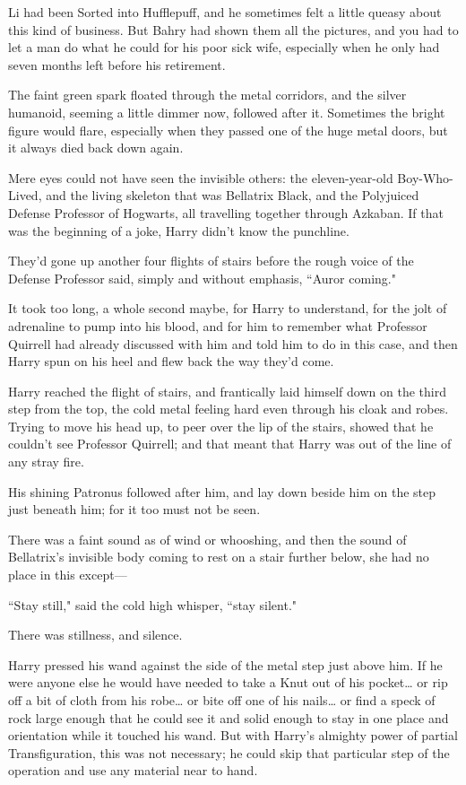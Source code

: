 Li had been Sorted into Hufflepuff, and he sometimes felt a little queasy about this kind of business. But Bahry had shown them all the pictures, and you had to let a man do what he could for his poor sick wife, especially when he only had seven months left before his retirement.

\later

The faint green spark floated through the metal corridors, and the silver humanoid, seeming a little dimmer now, followed after it. Sometimes the bright figure would flare, especially when they passed one of the huge metal doors, but it always died back down again.

Mere eyes could not have seen the invisible others: the eleven-year-old Boy-Who-Lived, and the living skeleton that was Bellatrix Black, and the Polyjuiced Defense Professor of Hogwarts, all travelling together through Azkaban. If that was the beginning of a joke, Harry didn't know the punchline.

They'd gone up another four flights of stairs before the rough voice of the Defense Professor said, simply and without emphasis, ``Auror coming."

It took too long, a whole second maybe, for Harry to understand, for the jolt of adrenaline to pump into his blood, and for him to remember what Professor Quirrell had already discussed with him and told him to do in this case, and then Harry spun on his heel and flew back the way they'd come.

Harry reached the flight of stairs, and frantically laid himself down on the third step from the top, the cold metal feeling hard even through his cloak and robes. Trying to move his head up, to peer over the lip of the stairs, showed that he couldn't see Professor Quirrell; and that meant that Harry was out of the line of any stray fire.

His shining Patronus followed after him, and lay down beside him on the step just beneath him; for it too must not be seen.

There was a faint sound as of wind or whooshing, and then the sound of Bellatrix's invisible body coming to rest on a stair further below, she had no place in this except---

``Stay still," said the cold high whisper, ``stay silent."

There was stillness, and silence.

Harry pressed his wand against the side of the metal step just above him. If he were anyone else he would have needed to take a Knut out of his pocket{\ldots} or rip off a bit of cloth from his robe{\ldots} or bite off one of his nails{\ldots} or find a speck of rock large enough that he could see it and solid enough to stay in one place and orientation while it touched his wand. But with Harry's almighty power of partial Transfiguration, this was not necessary; he could skip that particular step of the operation and use any material near to hand.

